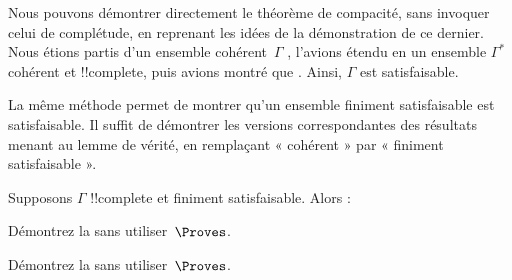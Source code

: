 \documentclass[../../../include/open-logic-section]{subfiles}
\begin{document}
      {}
      {}


Nous pouvons démontrer directement le théorème de compacité, sans
invoquer celui de complétude, en reprenant les idées de la
démonstration de ce dernier. Nous étions partis d'un ensemble
cohérent~$\Gamma$ , l'avions étendu en un ensemble
$\Gamma^*$ cohérent et !!{complete}, puis avions montré que
. Ainsi, $\Gamma$ est satisfaisable.

La même méthode permet de montrer qu'un ensemble 
finiment satisfaisable est satisfaisable. Il suffit de démontrer les
versions correspondantes des résultats menant au lemme de vérité, en
remplaçant « cohérent » par « finiment satisfaisable ».

\begin{prop}
Supposons $\Gamma$ !!{complete} et finiment satisfaisable. Alors :
\begin{enumerate}


\end{enumerate}
\end{prop}

\begin{prob}
Démontrez la  sans utiliser~$\Proves$.
\end{prob}
\tagendprob

\begin{prob}
Démontrez la  sans utiliser~$\Proves$.
\end{prob}
\tagendprob

\end{document}
